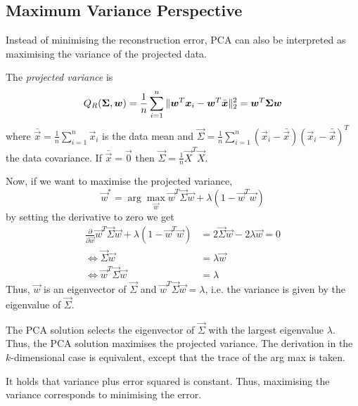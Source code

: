 \subsection{Maximum Variance Perspective}
Instead of minimising the reconstruction error,
PCA can also be interpreted as maximising the
variance of the projected data.

The \emph{projected variance} is
\begin{equation*}
    Q_R(\boldsymbol{\Sigma}, \boldsymbol{w}) =
    \frac{1}{n} \sum_{i=1}^n{\lVert
        \boldsymbol{w}^T \boldsymbol{x}_i - \boldsymbol{w}^T \bar{\boldsymbol{x}}
    \rVert_2^2}
    = \boldsymbol{w}^T \boldsymbol{\Sigma} \boldsymbol{w}
\end{equation*}
where $\bar{\vec{x}} = \frac{1}{n} \sum_{i=1}^n{\vec{x}_i}$
is the data mean and
$\vec{\Sigma} = \frac{1}{n}\sum_{i=1}^n{(\vec{x}_i - \bar{\vec{x}}) (\vec{x}_i - \bar{\vec{x}})^T}$
the data covariance.
If $\bar{\vec{x}} = \vec{0}$ then
$\vec{\Sigma} = \frac{1}{n} \vec{X}^T \vec{X}$.

Now, if we want to maximise the projected variance,
\begin{equation*}
    \vec{w}^* = \arg\max_{\vec{w}}{
        \vec{w}^T \vec{\Sigma} \vec{w} + \lambda (1 - \vec{w}^T \vec{w})
    }
\end{equation*}
by setting the derivative to zero we get
\begin{align*}
    \frac{\partial}{\partial \vec{w}}
    \vec{w}^T \vec{\Sigma} \vec{w} + \lambda (1 - \vec{w}^T \vec{w}) &= 2 \vec{\Sigma} \vec{w} - 2 \lambda \vec{w} = 0 \\
    \Leftrightarrow \vec{\Sigma} \vec{w}
    &= \lambda \vec{w} \\
    \Leftrightarrow \vec{w}^T \vec{\Sigma} \vec{w} &= \lambda
\end{align*}
Thus, $\vec{w}$ is an eigenvector of $\vec{\Sigma}$ and
$\vec{w}^T \vec{\Sigma} \vec{w} = \lambda$,
i.e. the variance is given by the eigenvalue of $\vec{\Sigma}$.

The PCA solution selects the eigenvector of $\vec{\Sigma}$
with the largest eigenvalue $\lambda$.
Thus, the PCA solution maximises the projected variance.
The derivation in the $k$-dimensional case is equivalent,
except that the trace of the arg max is taken.

It holds that
variance plus error squared is constant.
Thus, maximising the variance corresponds to minimising
the error.
